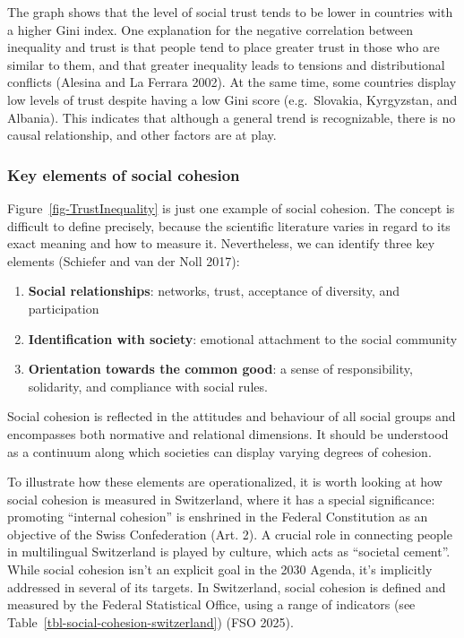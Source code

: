 \documentclass[
  a4paper,
  DIV=11,
  numbers=noendperiod,
  oneside,
  openany]{scrreprt}
\begin{document}
The graph shows that the level of social trust tends to be lower in
countries with a higher Gini index. One explanation for the negative
correlation between inequality and trust is that people tend to place
greater trust in those who are similar to them, and that greater
inequality leads to tensions and distributional conflicts (Alesina and
La Ferrara 2002). At the same time, some countries display low levels of
trust despite having a low Gini score (e.g.~Slovakia, Kyrgyzstan, and
Albania). This indicates that although a general trend is recognizable,
there is no causal relationship, and other factors are at play.

\subsubsection{Key elements of social
cohesion}\label{key-elements-of-social-cohesion}

Figure~\ref{fig-TrustInequality} is just one example of social cohesion.
The concept is difficult to define precisely, because the scientific
literature varies in regard to its exact meaning and how to measure it.
Nevertheless, we can identify three key elements ({Schiefer and van der
Noll} 2017):

\begin{enumerate}
\def\labelenumi{\arabic{enumi}.}
\item
  \textbf{Social relationships}: networks, trust, acceptance of
  diversity, and participation
\item
  \textbf{Identification with society}: emotional attachment to the
  social community
\item
  \textbf{Orientation towards the common good}: a sense of
  responsibility, solidarity, and compliance with social rules.
\end{enumerate}

Social cohesion is reflected in the attitudes and behaviour of all
social groups and encompasses both normative and relational dimensions.
It should be understood as a continuum along which societies can display
varying degrees of cohesion.

To illustrate how these elements are operationalized, it is worth
looking at how social cohesion is measured in Switzerland, where it has
a special significance: promoting ``internal cohesion'' is enshrined in
the Federal Constitution as an objective of the Swiss Confederation
(Art. 2). A crucial role in connecting people in multilingual
Switzerland is played by culture, which acts as ``societal cement''.
While social cohesion isn't an explicit goal in the 2030 Agenda, it's
implicitly addressed in several of its targets. In Switzerland, social
cohesion is defined and measured by the Federal Statistical Office,
using a range of indicators (see
Table~\ref{tbl-social-cohesion-switzerland}) (FSO 2025).
\end{document}
